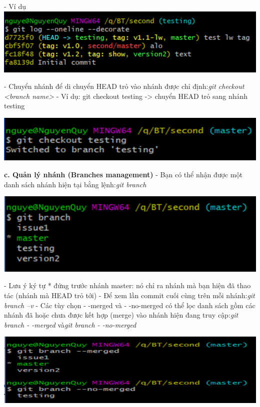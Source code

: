 \documentclass[12pt,a4paper]{report}
\begin{document}
	\label{fig:screenshot052}
\vskip 0.4cm\vskip 0.4cm
- Ví dụ
\vskip 0.4cm
	\includegraphics[width=0.8\linewidth]{screenshot053}
	
	\label{fig:screenshot053}
\vskip 0.4cm\vskip 0.4cm
- Chuyển nhánh để di chuyển HEAD trỏ vào nhánh được chỉ định:{\it git checkout <branch name>} \vskip 0.4cm
- Ví dụ: git checkout testing -> chuyển HEAD trỏ sang nhánh testing\vskip 0.4cm

	\includegraphics[width=0.8\linewidth]{screenshot054}

	\label{fig:screenshot054}
\vskip 0.4cm\vskip 0.4cm
{\bf c. Quản lý nhánh (Branches management)}\vskip 0.4cm
- Bạn có thể nhận được một danh sách nhánh hiện tại bằng lệnh:{\it git branch}\vskip 0.4cm

	\includegraphics[width=0.8\linewidth]{screenshot055}
	
	\label{fig:screenshot055}
\vskip 0.4cm\vskip 0.4cm
- Lưu ý ký tự * đứng trước nhánh master: nó chỉ ra nhánh mà bạn hiện đã thao tác (nhánh mà HEAD trỏ tới)\vskip 0.4cm
- Để xem lần commit cuối cùng trên mỗi nhánh:{\it git branch –v}\vskip 0.4cm
- Các tùy chọn - -merged và - -no-merged có thể lọc danh sách gồm các nhánh đã hoặc chưa được kết hợp (merge) vào nhánh hiện đang truy cập:{\it git branch - -merged} và{\it git branch - -no-merged}\vskip 0.4cm

	\includegraphics[width=0.8\linewidth]{screenshot056}
\end{document}
